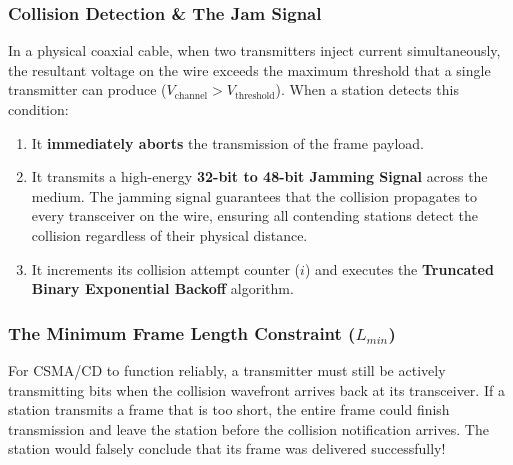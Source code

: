 \documentclass[12pt, a4paper]{article}
\begin{document}
\subsubsection{Collision Detection \& The Jam Signal}
In a physical coaxial cable, when two transmitters inject current simultaneously, the resultant voltage on the wire exceeds the maximum threshold that a single transmitter can produce ($V_{\text{channel}} > V_{\text{threshold}}$). When a station detects this condition:
\begin{enumerate}
    \item It \textbf{immediately aborts} the transmission of the frame payload.
    \item It transmits a high-energy \textbf{32-bit to 48-bit Jamming Signal} across the medium. The jamming signal guarantees that the collision propagates to every transceiver on the wire, ensuring all contending stations detect the collision regardless of their physical distance.
    \item It increments its collision attempt counter ($i$) and executes the \textbf{Truncated Binary Exponential Backoff} algorithm.
\end{enumerate}

\subsubsection{The Minimum Frame Length Constraint ($L_{min}$)}
For CSMA/CD to function reliably, a transmitter must still be actively transmitting bits when the collision wavefront arrives back at its transceiver. If a station transmits a frame that is too short, the entire frame could finish transmission and leave the station before the collision notification arrives. The station would falsely conclude that its frame was delivered successfully!
\end{document}
